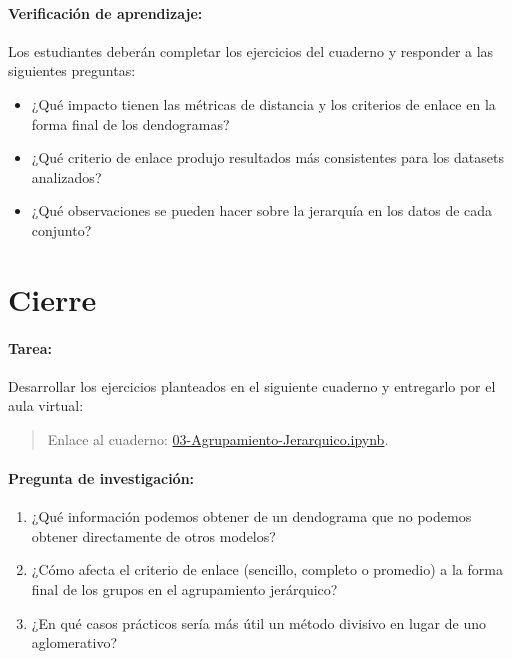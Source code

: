 \documentclass[a4,11pt]{aleph-notas}
\begin{document}
\paragraph{Verificación de aprendizaje:}  
Los estudiantes deberán completar los ejercicios del cuaderno y responder a las siguientes preguntas:
    \begin{itemize}
        \item ¿Qué impacto tienen las métricas de distancia y los criterios de enlace en la forma final de los dendogramas?
        \item ¿Qué criterio de enlace produjo resultados más consistentes para los datasets analizados?
        \item ¿Qué observaciones se pueden hacer sobre la jerarquía en los datos de cada conjunto?
    \end{itemize}






\section*{Cierre}

\paragraph{Tarea:}  
    Desarrollar los ejercicios planteados en el siguiente cuaderno y entregarlo por el aula virtual:
    \begin{quote}
        Enlace al cuaderno: \href{https://colab.research.google.com/github/andres-merino/AprendizajeAutomaticoInicial-05-N0105/blob/main/2-Ejercicios/03-Agrupamiento-Jerarquico.ipynb}{03-Agrupamiento-Jerarquico.ipynb}.
    \end{quote}

\paragraph{Pregunta de investigación:}  
\begin{enumerate}[leftmargin=*]
    \item ¿Qué información podemos obtener de un dendograma que no podemos obtener directamente de otros modelos?
    \item ¿Cómo afecta el criterio de enlace (sencillo, completo o promedio) a la forma final de los grupos en el agrupamiento jerárquico?
    \item ¿En qué casos prácticos sería más útil un método divisivo en lugar de uno aglomerativo?
\end{enumerate}
    
\end{document}
